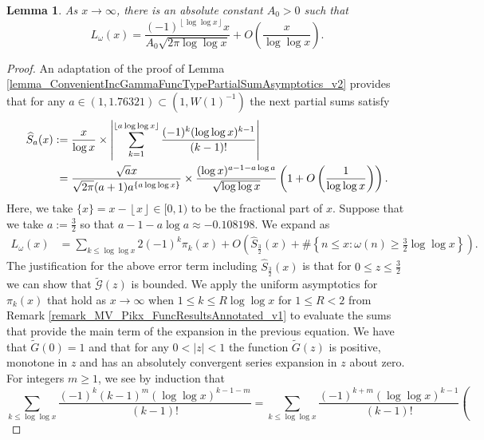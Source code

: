 \documentclass[11pt,reqno,a4letter]{article}
\newcommand{\hlocalref}[1]{\hyperref[#1]{\ref{#1}}}
\numberwithin{equation}{section}
\numberwithin{figure}{section}
\numberwithin{table}{section}
\newcommand{\floor}[1]{\left\lfloor #1 \right\rfloor}
\theoremstyle{plain}
\newtheorem{lemma}[theorem]{Lemma}
\numberwithin{theorem}{section}
\theoremstyle{definition}
\begin{document}
\begin{lemma} 
\label{cor_AsymptoticsForSignedSumsOfomegan_v1}
As $x \rightarrow \infty$, there is an absolute constant $A_0 > 0$ such that 
\[
L_{\omega}(x) = 
     \frac{(-1)^{\floor{\log\log x}} x}{A_0 \sqrt{2\pi \log\log x}} + 
     O\left(\frac{x}{\log\log x}\right). 
\]
\end{lemma}
\begin{proof}
An adaptation of the proof of Lemma \hlocalref{lemma_ConvenientIncGammaFuncTypePartialSumAsymptotics_v2} 
provides that for any $a \in (1, 1.76321) \subset \left(1, W(1)^{-1}\right)$ the 
next partial sums satisfy 
\begin{align}
\notag 
\widehat{S}_a(x) & := 
     \frac{x}{\log x} \times \left\lvert \sum_{k=1}^{\floor{a\log\log x}} \frac{(-1)^{k} (\log\log x)^{k-1}}{(k-1)!} 
     \right\rvert \\ 
\label{eqn_ConvenientIncGammaFuncTypePartialSumAsymptotics_va3} 
	& \phantom{:} = \frac{\sqrt{a} x}{\sqrt{2\pi}(a+1) a^{\{a\log\log x\}}} 
     \times \frac{(\log x)^{a-1-a\log a}}{\sqrt{\log\log x}} 
     \left(1 + O\left(\frac{1}{\log\log x}\right)\right). 
\end{align}
Here, we take $\{x\} = x - \floor{x} \in [0, 1)$ to be the fractional part of $x$. 
Suppose that we take $a := \frac{3}{2}$ so that $a-1-a\log a \approx -0.108198$. 
We expand as 
\begin{align*}
L_{\omega}(x) & = 
     \sum_{k \leq \log\log x} 2 (-1)^{k} \pi_k(x) + 
     O\left(\widehat{S}_{\frac{3}{2}}(x) + 
     \#\left\{n \leq x: \omega(n) \geq \frac{3}{2}\log\log x\right\}\right). 
\end{align*} 
The justification for the above error term including $\widehat{S}_{\frac{3}{2}}(x)$ is that for 
$0 \leq z \leq \frac{3}{2}$ we can show that $\widetilde{\mathcal{G}}\left(z\right)$ is bounded. 
We apply the uniform asymptotics for $\pi_k(x)$ that hold as $x \rightarrow \infty$ when 
$1 \leq k \leq R \log\log x$ for $1 \leq R < 2$ from 
Remark \hlocalref{remark_MV_Pikx_FuncResultsAnnotated_v1} to evaluate the sums that provide the 
main term of the expansion in the previous equation. 
We have that $\widetilde{G}(0)=1$ and that for any 
$0 < |z| < 1$ the function $\widetilde{G}(z)$ is positive, monotone in $z$ and 
has an absolutely convergent series expansion in $z$ about zero. 
For integers $m \geq 1$, we see by induction that 
\[
\sum_{k \leq \log\log x} \frac{(-1)^k (k-1)^m (\log\log x)^{k-1-m}}{(k-1)!} = 
     \sum_{k \leq \log\log x} \frac{(-1)^{k+m} (\log\log x)^{k-1}}{(k-1)!} \left( 
\]
\end{proof}
\end{document}
